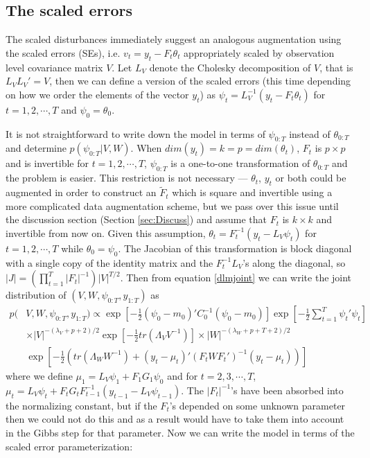 \documentclass{article}
\begin{document}
\subsection{The scaled errors}\label{sec:scalederrors}
The scaled disturbances immediately suggest an analogous augmentation using the scaled errors (SEs), i.e. $v_t=y_t - F_t\theta_t$ appropriately scaled by observation level covariance matrix $V$. Let $L_V$ denote the Cholesky decomposition of $V$, that is $L_VL_V'=V$, then we can define a version of the scaled errors (this time depending on how we order the elements of the vector $y_t$) as $\psi_t = L_V^{-1}(y_t - F_t\theta_t)$ for $t=1,2,\cdots,T$ and $\psi_0 = \theta_0$. 

It is not straightforward to write down the model in terms of $\psi_{0:T}$ instead of $\theta_{0:T}$ and determine $p(\psi_{0:T}|V,W)$. When $dim(y_t)=k=p=dim(\theta_t)$, $F_t$ is $p\times p$ and is invertible for $t=1,2,\cdots,T$, $\psi_{0:T}$ is a one-to-one transformation of $\theta_{0:T}$ and the problem is easier. This restriction is not necessary --- $\theta_t$, $y_t$ or both could be augmented in order to construct an $\tilde{F}_t$ which is square and invertible using a more complicated data augmentation scheme, but we pass over this issue until the discussion section (Section \ref{sec:Discuss}) and assume that $F_t$ is $k\times k$ and invertible from now on. Given this assumption, $\theta_t = F_t^{-1}(y_t - L_V\psi_t)$ for $t=1,2,\cdots,T$ while $\theta_0=\psi_0$. The Jacobian of this transformation is block diagonal with a single copy of the identity matrix and the $F_t^{-1}L_V$'s along the diagonal, so $|J|=(\prod_{t=1}^T|F_t|^{-1})|V|^{T/2}$. Then from equation \eqref{dlmjoint} we can write the joint distribution of $(V, W, \psi_{0:T}, y_{1:T})$ as
\begin{align}
    p(&V,W,\psi_{0:T},y_{1:T}) \propto \exp\left[-\frac{1}{2}(\psi_0-m_0)'C_0^{-1}(\psi_0-m_0)\right] \exp\left[-\frac{1}{2}\sum_{t=1}^T\psi_t'\psi_t\right] \nonumber\\
  &\times |V|^{-(\lambda_V + p + 2)/2}\exp\left[-\frac{1}{2}tr\left(\Lambda_VV^{-1}\right)\right]  \times |W|^{-(\lambda_W + p + T + 2)/2} \nonumber\\
   & \exp\left[-\frac{1}{2}\left(tr\left(\Lambda_WW^{-1}\right) + (y_t - \mu_t)'(F_tWF_t')^{-1}(y_t-\mu_t)\right)\right]\label{dlmerrorjoint}
\end{align}
where we define $\mu_1 = L_V\psi_1 + F_1G_1\psi_0$ and for $t=2,3,\cdots,T$, $\mu_t =L_V\psi_t + F_tG_tF_{t-1}^{-1}(y_{t-1} - L_{V}\psi_{t-1})$. The $|F_t|^{-1}$'s have been absorbed into the normalizing constant, but if the $F_t$'s depended on some unknown parameter then we could not do this and as a result would have to take them into account in the Gibbs step for that parameter. Now we can write the model in terms of the scaled error parameterization:
\end{document}
